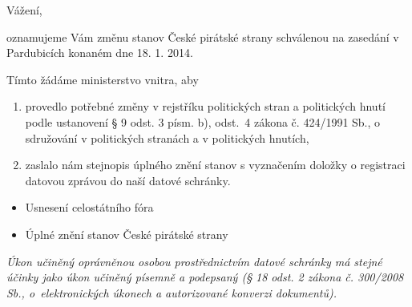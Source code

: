 \documentclass[11pt,a4paper,czech]{article}
\begin{document}

\def \yoursign {č. j. MV-39553-7/VS-2009}
\def \yourdate {}
\def \oursign {RP 2/2014}
\def \place {Praha}

\vspace*{0.5cm}
\printheader

\subject{Změna stanov}

Vážení,

oznamujeme Vám změnu stanov České pirátské strany schválenou na zasedání v Pardubicích konaném dne 18. 1. 2014.

Tímto žádáme ministerstvo vnitra, aby 
\begin{enumerate}
\item provedlo potřebné změny v rejstříku politických stran a politických hnutí podle ustanovení § 9 odst. 3 písm. b), odst.~4 zákona č. 424/1991 Sb., o sdružování v politických stranách a v politických hnutích,
\item zaslalo nám stejnopis úplného znění stanov s vyznačením doložky o registraci datovou zprávou do naší datové schránky.
\end{enumerate}

\signature{S úctou 

\bigskip
PhDr. Ivan Bartoš, Ph. D. \\ předseda Pirátů}

\attachments
\begin{itemize}
\item Usnesení celostátního fóra
\item Úplné znění stanov České pirátské strany
\end{itemize}

\bigskip
\emph{Úkon učiněný oprávněnou osobou prostřednictvím datové schránky má stejné účinky jako úkon učiněný písemně a podepsaný (§ 18 odst. 2 zákona č. 300/2008 Sb., o~elektronických úkonech a autorizované konverzi dokumentů).}
\end{document}
